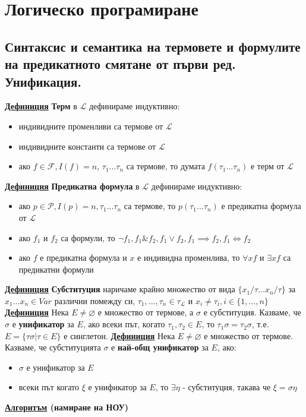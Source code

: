 \documentclass{article}
\begin{document}
\section*{Логическо програмиране}

\subsection*{Синтаксис и семантика на термовете и формулите на предикатното смятане от първи ред. Унификация.}

\textbf{\underline{Дефиниция}} \textbf{Терм} в $\mathcal{L}$ дефинираме индуктивно:
\begin{itemize}
    \item индивидните променливи са термове от $\mathcal{L}$
    \item индивидните константи са термове от $\mathcal{L}$
    \item ако $f \in \mathcal{F}, I(f) = n$, $\tau_1 ... \tau_n$ са термове, то думата $f(\tau_1 ... \tau_n)$ е терм от $\mathcal{L}$
\end{itemize}
\textbf{\underline{Дефиниция}} \textbf{Предикатна формула} в $\mathcal{L}$ дефинираме индуктивно:
\begin{itemize}
    \item ако $p \in \mathcal{P}, I(p) = n, \tau_1 ... \tau_n$ са термове, то $p(\tau_1 ... \tau_n)$ е предикатна формула от $\mathcal{L}$
    \item ако $f_1$ и $f_2$ са формули, то $\neg f_1, f_1 \& f_2, f_1 \vee f_2, f_1 \implies f_2, f_1 \iff f_2$ 
    \item ако $f$ е предикатна формула и $x$ е индивидна променлива, то $\forall xf$ и $\exists xf$ са предикатни формули
\end{itemize}
\textbf{\underline{Дефиниция}}
\textbf{Субституция} наричаме крайно множество от вида $\{x_1/\tau...x_n/\tau\}$ за $x_1...x_n \in Var$ различни помежду си,
$\tau_1,...,\tau_n \in \tau_{\mathcal{L}}$ и $x_i \neq \tau_i, i \in \{1,...,n\}$\newline\newline
\textbf{\underline{Дефиниция}}
Нека $E \neq \varnothing$ е множество от термове, а $\sigma$ е субституция. Казваме, че $\sigma$ е \textbf{унификатор}
за $E$, ако всеки път, когато $\tau_1, \tau_2 \in E$, то $\tau_1\sigma = \tau_2\sigma$, т.е. $E = \{\tau\sigma |
\tau \in E\}$ е синглетон. \newline\newline
\textbf{\underline{Дефиниция}}
Нека $E \neq \varnothing$ е множество от термове. Казваме, че субституцията $\sigma$ е \textbf{най-общ унификатор} за $E$, ако:
\begin{itemize}
    \item $\sigma$ е унификатор за $E$
    \item всеки път когато $\xi$ е унификатор за $E$, то $\exists \eta$ - субституция, такава че $\xi =
    \sigma\eta$
\end{itemize}
\textbf{\underline{Алгоритъм} (намиране на НОУ)}\newline
\end{document}
